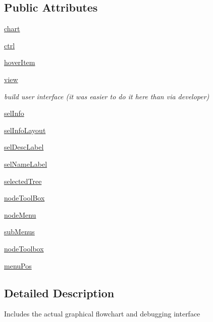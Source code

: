 \subsection*{Public Attributes}
\begin{DoxyCompactItemize}
\item 
\hyperlink{classFlowchart_1_1FlowchartWidget_a3eea10235556d1d25b05c4e5f37fa324}{chart}
\item 
\hyperlink{classFlowchart_1_1FlowchartWidget_adf3b7937106a3e532bd2d56ea9df365d}{ctrl}
\item 
\hyperlink{classFlowchart_1_1FlowchartWidget_a00653ef4736026c5bf0aae462690d250}{hover\+Item}
\item 
\hyperlink{classFlowchart_1_1FlowchartWidget_a8ee88da9be1a80e14f5cd4445ee9817e}{view}
\begin{DoxyCompactList}\small\item\em build user interface (it was easier to do it here than via developer) \end{DoxyCompactList}\item 
\hyperlink{classFlowchart_1_1FlowchartWidget_a417ef3e95c1853de2b30c6ecd0058c0c}{sel\+Info}
\item 
\hyperlink{classFlowchart_1_1FlowchartWidget_a5a95852906fbff5e7406f447e1843b72}{sel\+Info\+Layout}
\item 
\hyperlink{classFlowchart_1_1FlowchartWidget_a125c2e77ef484511338053bcd60dc20c}{sel\+Desc\+Label}
\item 
\hyperlink{classFlowchart_1_1FlowchartWidget_a3a9d580264503de8d51279bc0ab7fb28}{sel\+Name\+Label}
\item 
\hyperlink{classFlowchart_1_1FlowchartWidget_a4309a7cf46d773c98800badec5c93f52}{selected\+Tree}
\item 
\hyperlink{classFlowchart_1_1FlowchartWidget_a09e33d8ab2bea70edf770d8a41940b70}{node\+Tool\+Box}
\item 
\hyperlink{classFlowchart_1_1FlowchartWidget_ac4d094b9a9ac568c420805a207256968}{node\+Menu}
\item 
\hyperlink{classFlowchart_1_1FlowchartWidget_a8ea7900ef694e4fd187907589db25965}{sub\+Menus}
\item 
\hyperlink{classFlowchart_1_1FlowchartWidget_a762dba71a16dec9fa09eea6a49ff1795}{node\+Toolbox}
\item 
\hyperlink{classFlowchart_1_1FlowchartWidget_a6a0ee2e46f74471223f93826c63cc2dc}{menu\+Pos}
\end{DoxyCompactItemize}


\subsection{Detailed Description}
\begin{DoxyVerb}Includes the actual graphical flowchart and debugging interface\end{DoxyVerb}
 

